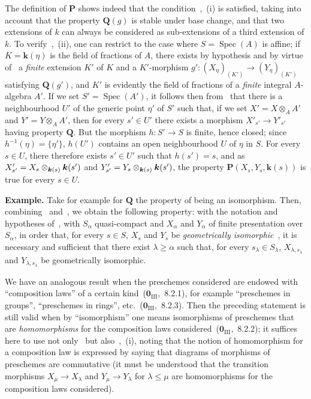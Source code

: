 The definition of $\boldsymbol{P}$ shows indeed that the condition~,~(i) is satisfied, taking into account that the property $\boldsymbol{Q}(g)$ is stable under base change, and that two extensions of $k$ can always be considered as sub-extensions of a third extension of $k$.
To verify~,~(ii), one can restrict to the case where $S=\operatorname{Spec}(A)$ is affine; if $K=\boldsymbol{k}(\eta)$ is the field of fractions of $A$, there exists by hypothesis and by virtue of~ a \emph{finite} extension $K'$ of $K$ and a $K'$-morphism $g':(X_\eta)_{(K')}\to(Y_\eta)_{(K')}$ satisfying $\boldsymbol{Q}(g')$, and $K'$ is evidently the field of fractions of a \emph{finite} integral $A$-algebra $A'$.
If we set $S'=\operatorname{Spec}(A')$, it follows then from~ that there is a neighbourhood $U'$ of the generic point $\eta'$ of $S'$ such that, if we set $X'=X\otimes_A A'$ and $Y'=Y\otimes_A A'$, then for every $s'\in U'$ there exists a morphism $X'_{s'}\to Y'_{s'}$ having property $\boldsymbol{Q}$.
But the morphism $h:S'\to S$ is finite, hence closed; since $h^{-1}(\eta)=\{\eta'\}$, $h(U')$ contains an open neighbourhood $U$ of $\eta$ in $S$.
For every $s\in U$, there therefore exists $s'\in U'$ such that $h(s')=s$, and as $X'_{s'}=X_s\otimes_{\boldsymbol{k}(s)}\boldsymbol{k}(s')$ and $Y'_{s'}=Y_s\otimes_{\boldsymbol{k}(s)}\boldsymbol{k}(s')$, the property $\boldsymbol{P}(X_s,Y_s,\boldsymbol{k}(s))$ is true for every $s\in U$.

\begin{env}[9.3.6]
\label{IV.9.3.6}
\textbf{Example.}
Take for example for $\boldsymbol{Q}$ the property of being an isomorphism.
Then, combining~ and~, we obtain the following property: with the notation and hypotheses of~, with $S_\alpha$ quasi-compact and $X_\alpha$ and $Y_\alpha$ of finite presentation over $S_\alpha$, in order that, for every $s\in S$, $X_s$ and $Y_s$ be \emph{geometrically isomorphic}~, it is necessary and sufficient that there exist $\lambda\geqslant\alpha$ such that, for every $s_\lambda\in S_\lambda$, $X_{\lambda,s_\lambda}$ and $Y_{\lambda,s_\lambda}$ be geometrically isomorphic.
\end{env}

We have an analogous result when the preschemes considered are endowed with ``composition laws'' of a certain kind~($\mathbf{0}_{\mathrm{III}}$,~8.2.1), for example ``preschemes in groups'', ``preschemes in rings'', etc.~($\mathbf{0}_{\mathrm{III}}$,~8.2.3).
Then the preceding statement is still valid when by ``isomorphism'' one means isomorphisms of preschemes that are \emph{homomorphisms} for the composition laws considered~($\mathbf{0}_{\mathrm{III}}$,~8.2.2); it suffices here to use not only~ but also~,~(i), noting that the notion of homomorphism for a composition law is expressed by saying that diagrams of morphisms of preschemes are commutative (it must be understood that the transition morphisms $X_\mu\to X_\lambda$ and $Y_\mu\to Y_\lambda$ for $\lambda\leqslant\mu$ are homomorphisms for the composition laws considered).

